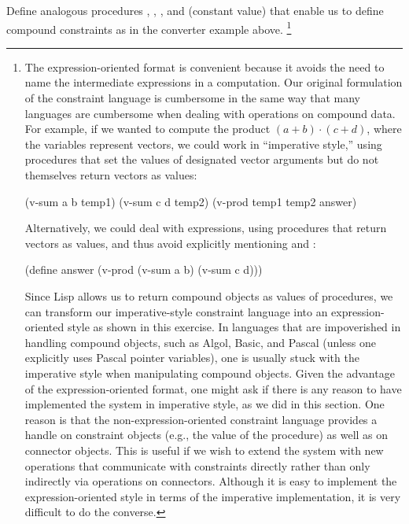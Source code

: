 \begin{exercise}
Define analogous procedures , , , and   (constant value) that enable us to define compound constraints as in the converter example above.%
\footnote{
		The expression-oriented format is convenient because it avoids the need to name the intermediate expressions in a computation.
		Our original formulation of the constraint language is cumbersome in the same way that many languages are cumbersome when dealing with operations on compound data.
		For example, if we wanted to compute the product \( (a + b) ⋅ (c + d) \), where the variables represent vectors, we could work in “imperative style,” using procedures that set the values of designated vector arguments but do not themselves return vectors as values:
	\begin{smallexample}
		(v-sum a b temp1)
		(v-sum c d temp2)
		(v-prod temp1 temp2 answer)
	\end{smallexample}
	Alternatively, we could deal with expressions, using procedures that return vectors as values, and thus avoid explicitly mentioning  and :
	\begin{smallexample}
		(define answer (v-prod (v-sum a b) (v-sum c d)))
	\end{smallexample}
	Since Lisp allows us to return compound objects as values of procedures, we can transform our imperative-style constraint language into an expression-oriented style as shown in this exercise.
	In languages that are impoverished in handling compound objects, such as Algol, Basic, and Pascal (unless one explicitly uses Pascal pointer variables), one is usually stuck with the imperative style when manipulating compound objects.
	Given the advantage of the expression-oriented format, one might ask if there is any reason to have implemented the system in imperative style, as we did in this section.
	One reason is that the non-expression-oriented constraint language provides a handle on constraint objects (e.g., the value of the  procedure) as well as on connector objects.
	This is useful if we wish to extend the system with new operations that communicate with constraints directly rather than only indirectly via operations on connectors.
	Although it is easy to implement the expression-oriented style in terms of the imperative implementation, it is very difficult to do the converse.
}
\end{exercise}

